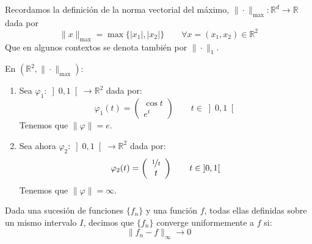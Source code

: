 \begin{definicion}
    Recordamos la definición de la norma vectorial del máximo, $\|\cdot \|_{\max}:\mathbb{R}^d\rightarrow\mathbb{R}$ dada por
    \begin{equation*}
        \|x\|_{\max} = \max\{|x_1|,|x_2|\} \qquad \forall x=(x_1,x_2)\in \mathbb{R}^2
    \end{equation*}
    Que en algunos contextos se denota también por $\|\cdot \|_1$.
\end{definicion}

\begin{ejemplo}
    En $(\mathbb{R}^2, \|\cdot \|_{\max})$:
    \begin{enumerate}
        \item Sea $\varphi_1:\left]0,1\right[\rightarrow\mathbb{R}^2$ dada por:
            \begin{equation*}
                \varphi_1(t) = \left(\begin{array}{c}
                    \cos t \\
                    e^t
                \end{array}\right) \qquad t\in \left]0,1\right[
            \end{equation*}
            Tenemos que $\|\varphi\| = e$.
        \item Sea ahora $\varphi_2:\left]0,1\right[\rightarrow\mathbb{R}^2$ dada por:
            \begin{equation*}
                \varphi_2(t) = \left(\begin{array}{c}
                        \nicefrac{1}{t} \\
                        t
                \end{array}\right) \qquad t\in \left]0,1\right[
            \end{equation*}
            Tenemos que $\|\varphi\| = \infty$.
    \end{enumerate}
\end{ejemplo}

\begin{definicion}
    Dada una sucesión de funciones $\{f_n\}$ y una función $f$, todas ellas definidas sobre un mismo intervalo $I$, decimos que $\{f_n\}$ converge uniformemente a $f$ si:
    \begin{equation*}
        \|f_n - f\|_\infty \rightarrow 0
    \end{equation*}
\end{definicion}

